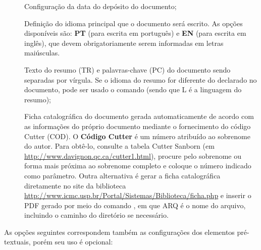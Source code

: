 \begin{description}
 \item[] Configuração da data do depósito do documento;
 
 \item[] Definição do idioma principal que o documento será escrito. As opções disponíveis são: \textbf{PT} (para escrita em português) e \textbf{EN} (para escrita em inglês), que devem obrigatoriamente serem informadas em letras maiúsculas.

 \item[] Texto do resumo (TR) e palavras-chave (PC) do documento sendo separadas por vírgula. Se o idioma do resumo for diferente do declarado no documento, pode ser usado o comando  (sendo que L é a linguagem do resumo);
 
 \item[] Ficha catalográfica do documento gerada automaticamente de acordo com as informações do próprio documento mediante o fornecimento do código Cutter (COD). O \textbf{Código Cutter} é um número atribuído ao sobrenome do autor. Para obtê-lo, consulte a tabela Cutter Sanborn (em \url{http://www.davignon.qc.ca/cutter1.html}), procure pelo sobrenome ou forma mais próxima ao sobrenome completo e coloque o número indicado como parâmetro. Outra alternativa é gerar a ficha catalográfica diretamente no site da biblioteca \url{http://www.icmc.usp.br/Portal/Sistemas/Biblioteca/ficha.php} e inserir o PDF gerado por meio do comando , em que ARQ é o nome do arquivo, incluindo o caminho do diretório se necessário.

 
\end{description}

As opções seguintes correspondem também as configurações dos elementos pré-textuais, porém seu uso é opcional: 

